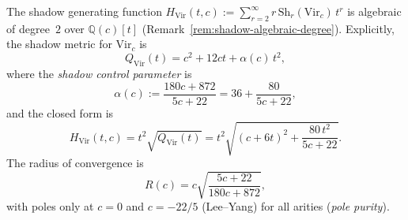 \begin{theorem}
\label{thm:virasoro-shadow-generating-function}
The shadow generating function
$H_{\mathrm{Vir}}(t,c) := \sum_{r=2}^{\infty} r\,\mathrm{Sh}_r(\mathrm{Vir}_c)\,t^r$
is algebraic of degree~$2$ over $\mathbb{Q}(c)[t]$
\textup{(}Remark~\textup{\ref{rem:shadow-algebraic-degree})}.
Explicitly, the shadow metric for $\mathrm{Vir}_c$ is
\begin{equation}\label{eq:virasoro-shadow-gf}
Q_{\mathrm{Vir}}(t) = c^2 + 12ct + \alpha(c)\,t^2,
\end{equation}
where the \emph{shadow control parameter} is
\begin{equation}\label{eq:virasoro-shadow-alpha}
\alpha(c) := \frac{180c + 872}{5c + 22}
= 36 + \frac{80}{5c+22},
\end{equation}
and the closed form is
\begin{equation}\label{eq:virasoro-shadow-gf-closed}
H_{\mathrm{Vir}}(t,c)
= t^2\sqrt{Q_{\mathrm{Vir}}(t)}
= t^2\sqrt{(c + 6t)^2 + \frac{80\,t^2}{5c+22}}.
\end{equation}
The radius of convergence is
\begin{equation}\label{eq:virasoro-shadow-gf-radius}
R(c) = c\sqrt{\frac{5c+22}{180c+872}},
\end{equation}
with poles only at $c = 0$ and
$c = -22/5$ \textup{(}Lee--Yang\textup{)} for all arities
\textup{(}\emph{pole purity}\textup{)}.
\end{theorem}

